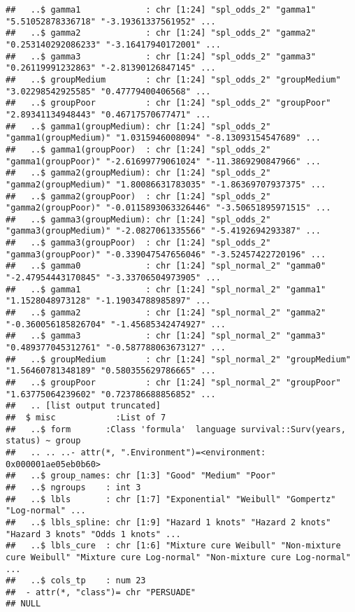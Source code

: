 \documentclass[
]{article}
\begin{document}
\begin{verbatim}
##   ..$ gamma1             : chr [1:24] "spl_odds_2" "gamma1" "5.51052878336718" "-3.19361337561952" ...
##   ..$ gamma2             : chr [1:24] "spl_odds_2" "gamma2" "0.253140292086233" "-3.16417940172001" ...
##   ..$ gamma3             : chr [1:24] "spl_odds_2" "gamma3" "0.26119991232863" "-2.81390126847145" ...
##   ..$ groupMedium        : chr [1:24] "spl_odds_2" "groupMedium" "3.02298542925585" "0.47779400406568" ...
##   ..$ groupPoor          : chr [1:24] "spl_odds_2" "groupPoor" "2.89341134948443" "0.46717570677471" ...
##   ..$ gamma1(groupMedium): chr [1:24] "spl_odds_2" "gamma1(groupMedium)" "1.0315946008094" "-8.13093154547689" ...
##   ..$ gamma1(groupPoor)  : chr [1:24] "spl_odds_2" "gamma1(groupPoor)" "-2.61699779061024" "-11.3869290847966" ...
##   ..$ gamma2(groupMedium): chr [1:24] "spl_odds_2" "gamma2(groupMedium)" "1.80086631783035" "-1.86369707937375" ...
##   ..$ gamma2(groupPoor)  : chr [1:24] "spl_odds_2" "gamma2(groupPoor)" "-0.0115893063326446" "-3.50651895971515" ...
##   ..$ gamma3(groupMedium): chr [1:24] "spl_odds_2" "gamma3(groupMedium)" "-2.0827061335566" "-5.4192694293387" ...
##   ..$ gamma3(groupPoor)  : chr [1:24] "spl_odds_2" "gamma3(groupPoor)" "-0.339047547656046" "-3.52457422720196" ...
##   ..$ gamma0             : chr [1:24] "spl_normal_2" "gamma0" "-2.47954443170845" "-3.33706504973905" ...
##   ..$ gamma1             : chr [1:24] "spl_normal_2" "gamma1" "1.1528048973128" "-1.19034788985897" ...
##   ..$ gamma2             : chr [1:24] "spl_normal_2" "gamma2" "-0.360056185826704" "-1.45685342474927" ...
##   ..$ gamma3             : chr [1:24] "spl_normal_2" "gamma3" "0.489377045312761" "-0.587788063673127" ...
##   ..$ groupMedium        : chr [1:24] "spl_normal_2" "groupMedium" "1.56460781348189" "0.580355629786665" ...
##   ..$ groupPoor          : chr [1:24] "spl_normal_2" "groupPoor" "1.63775064239602" "0.723786688856852" ...
##   .. [list output truncated]
##  $ misc            :List of 7
##   ..$ form       :Class 'formula'  language survival::Surv(years, status) ~ group
##   .. .. ..- attr(*, ".Environment")=<environment: 0x000001ae05eb0b60> 
##   ..$ group_names: chr [1:3] "Good" "Medium" "Poor"
##   ..$ ngroups    : int 3
##   ..$ lbls       : chr [1:7] "Exponential" "Weibull" "Gompertz" "Log-normal" ...
##   ..$ lbls_spline: chr [1:9] "Hazard 1 knots" "Hazard 2 knots" "Hazard 3 knots" "Odds 1 knots" ...
##   ..$ lbls_cure  : chr [1:6] "Mixture cure Weibull" "Non-mixture cure Weibull" "Mixture cure Log-normal" "Non-mixture cure Log-normal" ...
##   ..$ cols_tp    : num 23
##  - attr(*, "class")= chr "PERSUADE"
## NULL
\end{verbatim}
\end{document}
